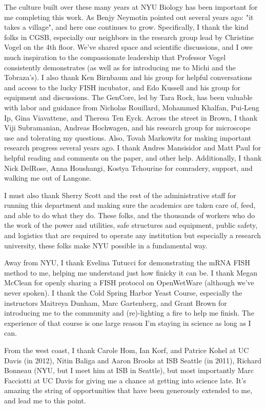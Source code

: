 \documentclass[12pt,letterpaper]{memoir}
\begin{document}
The culture built over these many years at NYU Biology has been
important for me completing this work. 
As Benjy Neymotin pointed out several years ago: "it takes a village",
and here one continues to grow.
Specifically,
I thank the kind folks in CGSB, especially our neighbors in
the research group lead by Christine Vogel on the 4th floor.
We've shared
space and scientific discussions, and I owe much inspiration to the 
compassionate leadership that Professor Vogel consistently 
demonstrates (as well as for introducing me to Michi and the
Tobraza's).
I also thank Ken Birnbaum and his group for helpful conversations and
access to the lucky FISH incubator, and Edo Kussell and his group
for equipment and discussions.
The GenCore, led by Tara Rock, has been valuable with labor
and guidance from Nicholas Rouillard, Mohammed Khalfan, Pui-Leng Ip,
Gina Viavattene, and Theresa Ten Eyck.
Across the street in Brown, I thank Viji Subramanian, 
Andreas Hochwagen, and his research group for microscope use 
and tolerating my questions.
Also, Tovah Markowitz for making important research progress
several years ago.
I thank Andres Mansisidor and Matt Paul for helpful reading and 
comments on the paper, and other help.
Additionally, I thank Nick DelRose, Anna Houshangi, Kostya Tchourine
for comradery, support, and walking me out of Langone.

I must also thank Sherry Scott and the rest of the administrative
staff for running this department and making sure the academics
are taken care of, feed, and able to do what they do. These
folks, and the thousands of workers who do the work of the
power and utilities, safe structures and equipment, 
public safety, and logistics that are required to operate any
institution but especially a research university, these folks
make NYU possible in a fundamental way.

Away from NYU, I thank
Evelina Tutucci for demonstrating the mRNA FISH method to me,
helping me understand just how finicky it can be.
I thank Megan McClean for openly sharing a FISH protocol on
OpenWetWare (although we've never spoken).
I thank the Cold Spring Harbor Yeast Course, especially the instructors
Maitreya Dunham, Marc Gartenberg, and Grant Brown for introducing
me to the community and (re)-lighting a fire to help me finish.
The experience of that course is one large reason I'm staying in 
science as long as I can.

From the west coast, I thank Carole Hom, Ian Korf, 
and Patrice Kohel at UC Davis (in 2012), 
Nitin Baliga and Aaron Brooks at ISB Seattle (in 2011), 
Richard Bonneau (NYU, but I meet him at ISB in Seattle),
but most importantly Marc Facciotti at UC Davis for 
giving me a chance at getting into science late.
It's amazing the string of opportunities that have been generously
extended to me, and lead me to this point.
\end{document}
